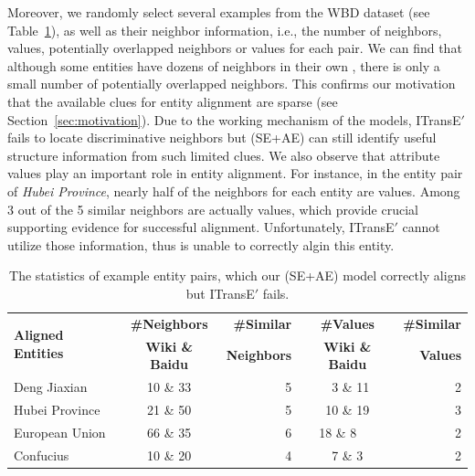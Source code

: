 Moreover, we randomly select several examples from the WBD dataset (see Table~\ref{example}), as well as their neighbor information, i.e.,
the number of neighbors, values, potentially overlapped neighbors or values for each pair. We can find that although some entities have
dozens of neighbors in their own \KGs,  there is only a small number of potentially overlapped neighbors. This confirms our motivation that
the available clues for entity alignment are sparse (see Section~\ref{sec:motivation}). Due to the working mechanism of the models,
  ITransE$'$ fails to locate discriminative neighbors but \HRGCN (SE+AE) can still identify useful structure information from such limited clues.
We also observe that attribute values play an important role in entity alignment. For instance, in the entity pair of \textit{Hubei
Province}, nearly half of the neighbors for each entity are values. Among 3 out of the 5 similar neighbors are actually values, which
provide crucial supporting evidence for successful alignment. Unfortunately, ITransE$'$ cannot utilize those information, thus is unable to
correctly algin this entity.

\begin{table}
	\centering
	\scriptsize
	\begin{tabular}{lcrcr}
		\toprule
		\multirow{2}{*}{\bf Aligned Entities} & \bf \#Neighbors & \bf \#Similar & \bf \#Values & \bf \#Similar \\
		&\bf  Wiki \& Baidu &\bf  Neighbors &\bf  Wiki \& Baidu &\bf  Values \\
		\midrule
		\rowcolor{Gray} Deng Jiaxian & 10 \& 33 & 5 & \ 3 \& 11 & 2\\
		Hubei Province & 21 \& 50 & 5 & 10 \& 19 & 3\\
		\rowcolor{Gray} European Union & 66 \& 35 & 6 & 18 \& 8\ \ \ & 2\\
		Confucius & 10 \& 20 & 4 & 7 \& 3 & 2\\
		\bottomrule
	\end{tabular}
	\caption{The statistics of example entity pairs, which our \HRGCN(SE+AE) model correctly aligns but ITransE$'$ fails.}
	\label{example}
\end{table}



